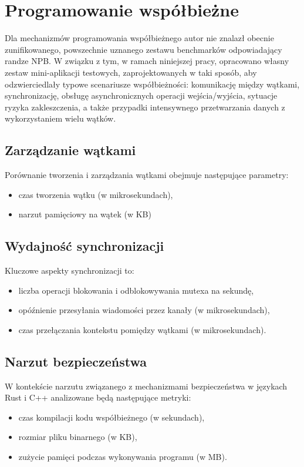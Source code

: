 \section{Programowanie współbieżne}
Dla mechanizmów programowania współbieżnego autor nie znalazł obecnie zunifikowanego, powszechnie uznanego zestawu benchmarków odpowiadający randze NPB. W związku z tym, w ramach niniejszej pracy, opracowano własny zestaw mini-aplikacji testowych, zaprojektowanych w taki sposób, aby odzwierciedlały typowe scenariusze współbieżności: komunikację między wątkami, synchronizację, obsługę asynchronicznych operacji wejścia/wyjścia, sytuacje ryzyka zakleszczenia, a także przypadki intensywnego przetwarzania danych z wykorzystaniem wielu wątków.

\subsection{Zarządzanie wątkami}
Porównanie tworzenia i zarządzania wątkami obejmuje następujące parametry:
\begin{itemize}
\item czas tworzenia wątku (w mikrosekundach),
\item narzut pamięciowy na wątek (w KB)
\end{itemize}

\subsection{Wydajność synchronizacji}
Kluczowe aspekty synchronizacji to:
\begin{itemize}
\item liczba operacji blokowania i odblokowywania mutexa na sekundę,
\item opóźnienie przesyłania wiadomości przez kanały (w mikrosekundach),
\item czas przełączania kontekstu pomiędzy wątkami (w mikrosekundach).
\end{itemize}

\subsection{Narzut bezpieczeństwa}
W kontekście narzutu związanego z mechanizmami bezpieczeństwa w językach Rust i C++ analizowane będą następujące metryki:
\begin{itemize}
\item czas kompilacji kodu współbieżnego (w sekundach),
\item rozmiar pliku binarnego (w KB),
\item zużycie pamięci podczas wykonywania programu (w MB).
\end{itemize}

